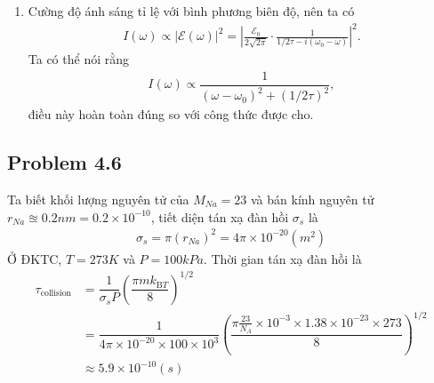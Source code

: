 \documentclass{article}
\newcommand{\f}[2]{\dfrac{#1}{#2}}
\begin{document}
\begin{enumerate}[label=(\alph*)]
\begin{align}
		& = \frac{\mathcal{E}_0}{2\sqrt{2\pi}} \left( \frac{1}{1/2\tau - i(\omega_0 - \omega)} + \frac{1}{1/2\tau + i(\omega_0 + \omega)} \right).
	\end{align}
	Giả sử rằng $\omega_0 \gg 1/\tau$,
	\begin{align*}
		\mathcal{E}(\omega) \approx \frac{\mathcal{E}_0}{2\sqrt{2\pi}} \cdot \frac{1}{1/2\tau - i(\omega_0 - \omega)}.
	\end{align*}(ĐPCM)
	\item  Cường độ ánh sáng tỉ lệ với bình phương biên độ, nên ta có
	\begin{align}
		I(\omega) \propto |\mathcal{E}(\omega)|^2 = \left|\frac{\mathcal{E}_0}{2\sqrt{2\pi}} \cdot \frac{1}{1/2\tau - i(\omega_0 - \omega)}\right|^2.
	\end{align}
	Ta có thể nói rằng
	\begin{align}
		I(\omega) \propto \f{1}{(\omega - \omega_0)^2 + (1/2\tau)^2},
	\end{align}
	điều này hoàn toàn đúng so với công thức được cho.
\end{enumerate}
\subsection*{Problem 4.6}
Ta biết khối lượng nguyên tử của $M_{Na} = 23$ và bán kính nguyên tử $r_{Na} \approxeq 0.2nm = 0.2\times 10^{-10}$, tiết diện tán xạ đàn hồi $\sigma_s$ là
\begin{align}
	\sigma_s = \pi (r_{Na})^2 = 4\pi \times 10^{-20} (m^2)
\end{align}  
Ở ĐKTC, $T = 273 K$ và $P = 100k Pa$. Thời gian tán xạ đàn hồi là
\begin{align*}
	\tau_{\text{collision}} 
	&= \f{1}{\sigma_s P} \left( \f{\pi m k_{\text{B} T}}{8} \right)^{1/2} \\
	& = \f{1}{4\pi \times 10^{-20 } \times 100\times10^{3}} \left( \f{\pi \frac{23}{N_A} \times 10^{-3} \times 1.38\times 10^{-23} \times 273 }{8} \right)^{1/2}\\
	& \approx 5.9 \times 10^{-10} (s)
\end{align*}
\end{document}
